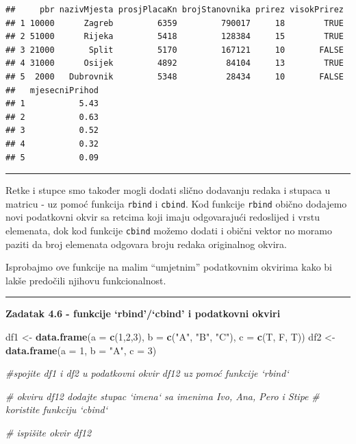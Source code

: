 \documentclass[]{book}
\newenvironment{Shaded}{\begin{snugshade}}{\end{snugshade}}
\newcommand{\KeywordTok}[1]{\textcolor[rgb]{0.13,0.29,0.53}{\textbf{#1}}}
\newcommand{\DataTypeTok}[1]{\textcolor[rgb]{0.13,0.29,0.53}{#1}}
\newcommand{\DecValTok}[1]{\textcolor[rgb]{0.00,0.00,0.81}{#1}}
\newcommand{\StringTok}[1]{\textcolor[rgb]{0.31,0.60,0.02}{#1}}
\newcommand{\CommentTok}[1]{\textcolor[rgb]{0.56,0.35,0.01}{\textit{#1}}}
\newcommand{\NormalTok}[1]{#1}
\theoremstyle{definition}
\theoremstyle{definition}
\theoremstyle{definition}
\theoremstyle{remark}
\begin{document}
\begin{verbatim}
##     pbr nazivMjesta prosjPlacaKn brojStanovnika prirez visokPrirez
## 1 10000      Zagreb         6359         790017     18        TRUE
## 2 51000      Rijeka         5418         128384     15        TRUE
## 3 21000       Split         5170         167121     10       FALSE
## 4 31000      Osijek         4892          84104     13        TRUE
## 5  2000   Dubrovnik         5348          28434     10       FALSE
##   mjesecniPrihod
## 1           5.43
## 2           0.63
## 3           0.52
## 4           0.32
## 5           0.09
\end{verbatim}

\begin{center}\rule{0.5\linewidth}{\linethickness}\end{center}

Retke i stupce smo također mogli dodati slično dodavanju redaka i
stupaca u matricu - uz pomoć funkcija \texttt{rbind} i \texttt{cbind}.
Kod funkcije \texttt{rbind} obično dodajemo novi podatkovni okvir sa
retcima koji imaju odgovarajući redoslijed i vrstu elemenata, dok kod
funkcije \texttt{cbind} možemo dodati i obični vektor no moramo paziti
da broj elemenata odgovara broju redaka originalnog okvira.

Isprobajmo ove funkcije na malim ``umjetnim'' podatkovnim okvirima kako
bi lakše predočili njihovu funkcionalnost.

\begin{center}\rule{0.5\linewidth}{\linethickness}\end{center}

\textbf{Zadatak 4.6 - funkcije `rbind'/`cbind' i podatkovni okviri}

\begin{Shaded}
\begin{Highlighting}[]
\NormalTok{df1 <-}\StringTok{ }\KeywordTok{data.frame}\NormalTok{(}\DataTypeTok{a =} \KeywordTok{c}\NormalTok{(}\DecValTok{1}\NormalTok{,}\DecValTok{2}\NormalTok{,}\DecValTok{3}\NormalTok{), }\DataTypeTok{b =} \KeywordTok{c}\NormalTok{(}\StringTok{"A"}\NormalTok{, }\StringTok{"B"}\NormalTok{, }\StringTok{"C"}\NormalTok{), }\DataTypeTok{c =} \KeywordTok{c}\NormalTok{(T, F, T))}
\NormalTok{df2 <-}\StringTok{ }\KeywordTok{data.frame}\NormalTok{(}\DataTypeTok{a =} \DecValTok{1}\NormalTok{, }\DataTypeTok{b =} \StringTok{"A"}\NormalTok{, }\DataTypeTok{c =} \DecValTok{3}\NormalTok{)}

\CommentTok{#spojite df1 i df2 u podatkovni okvir df12 uz pomoć funkcije `rbind`}


\CommentTok{# okviru df12 dodajte stupac `imena` sa imenima Ivo, Ana, Pero i Stipe}
\CommentTok{# koristite funkciju `cbind`}

\CommentTok{# ispišite okvir df12}
\end{Highlighting}
\end{Shaded}
\end{document}
